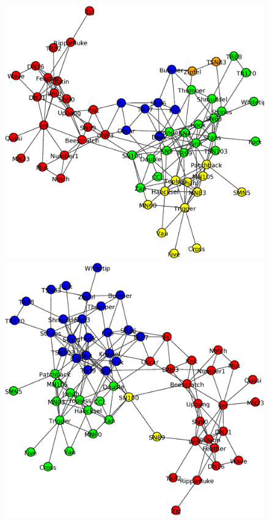 \begin{figure}
\centering
\includegraphics[scale = 0.2]{Edge_betweenness}
\includegraphics[scale = 0.2]{Fast_greedy} \\

\end{figure}
